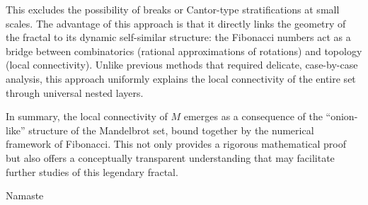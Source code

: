 \documentclass[12pt]{article}
\begin{document}
This excludes the possibility of breaks or Cantor-type stratifications at small scales. The advantage of this approach is that it directly links the geometry of the fractal to its dynamic self-similar structure: the Fibonacci numbers act as a bridge between combinatorics (rational approximations of rotations) and topology (local connectivity). Unlike previous methods that required delicate, case-by-case analysis, this approach uniformly explains the local connectivity of the entire set through universal nested layers.

In summary, the local connectivity of \(M\) emerges as a consequence of the ``onion-like'' structure of the Mandelbrot set, bound together by the numerical framework of Fibonacci. This not only provides a rigorous mathematical proof but also offers a conceptually transparent understanding that may facilitate further studies of this legendary fractal.

Namaste
\end{document}
